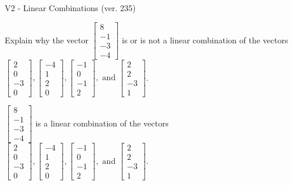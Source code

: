 \begin{exercise}
  \begin{exerciseTitle}V2 - Linear Combinations (ver. 235)\end{exerciseTitle}
  \begin{exerciseStatement}
    Explain why the vector \(\left[\begin{array}{c}
8 \\
-1 \\
-3 \\
-4
\end{array}\right]\)  is or is not a linear 
	combination of the vectors \(\left[\begin{array}{c}
2 \\
0 \\
-3 \\
0
\end{array}\right] , \left[\begin{array}{c}
-4 \\
1 \\
2 \\
0
\end{array}\right] , \left[\begin{array}{c}
-1 \\
0 \\
-1 \\
2
\end{array}\right] , \text{ and } \left[\begin{array}{c}
2 \\
2 \\
-3 \\
1
\end{array}\right]\).
	


  \end{exerciseStatement}
  \begin{exerciseAnswer}
   \(\left[\begin{array}{c}
8 \\
-1 \\
-3 \\
-4
\end{array}\right]\) 
  	 is  
	a linear combination of the vectors \(\left[\begin{array}{c}
2 \\
0 \\
-3 \\
0
\end{array}\right] , \left[\begin{array}{c}
-4 \\
1 \\
2 \\
0
\end{array}\right] , \left[\begin{array}{c}
-1 \\
0 \\
-1 \\
2
\end{array}\right] , \text{ and } \left[\begin{array}{c}
2 \\
2 \\
-3 \\
1
\end{array}\right]\).


\end{exerciseAnswer}
\end{exercise}

